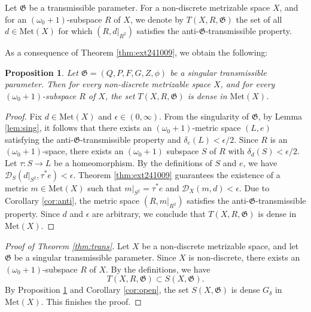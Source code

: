 \documentclass[a4paper, 12pt]{amsart}
\theoremstyle{plain}
\newtheorem{prop}[thm]{Proposition}
\theoremstyle{definition}
\theoremstyle{remark}
\newcommand{\met}[1]{\mathrm{Met}(#1)}
\newcommand{\metdis}{\mathcal{D}}
\begin{document}
Let 
$\mathfrak{G}$
 be a transmissible parameter. 
For a non-discrete metrizable space
 $X$, 
and for an
 $(\omega_0+1)$-subspace 
 $R$ 
 of
  $X$, 
we denote by 
$T(X, R, \mathfrak{G})$ 
the set of all 
$d\in \met{X}$
for which 
$(R, d|_{R^2})$ 
satisfies the 
anti-$\mathfrak{G}$-transmissible 
property.  




As a consequence of 
Theorem \ref{thm:ext241009}, 
we obtain the following:
\begin{prop}\label{prop:dense}
Let 
$\mathfrak{G}=(Q, P, F, G, Z, \phi)$ 
be a singular transmissible parameter. 
Then for every non-discrete metrizable space
 $X$, 
and for every 
$(\omega_0+1)$-subspace 
$R$ 
of 
$X$, 
the set 
$T(X, R, \mathfrak{G})$ 
is dense in 
$\met{X}$.  
\end{prop}
\begin{proof}
Fix 
$d\in \met{X}$ 
and 
$\epsilon\in (0, \infty)$.  
From the singularity of 
$\mathfrak{G}$,  
by Lemma 
\ref{lem:sing}, 
it follows that there exists an 
$(\omega_0+1)$-metric space 
$(L, e)$
satisfying the 
anti-$\mathfrak{G}$-transmissible  property 
and  
$\delta_{e}(L)<\epsilon/2$. 
Since 
$R$ 
is an 
$(\omega_0+1)$-space, 
there exists an 
$(\omega_0+1)$ 
subspace 
$S$ 
of 
$R$ 
with 
$\delta_{d}(S)<\epsilon/2$. 
Let 
$\tau\colon  S\to L$ 
be a homeomorphism. 
By the definitions of 
$S$ 
and 
$e$, 
we have 
$\metdis_{S}(d|_{S^2}, \tau^{*}e)<\epsilon$. 
Theorem 
\ref{thm:ext241009}
guarantees 
the existence of  a metric 
$m\in \met{X}$ 
such that 
$m|_{S^2}=\tau^{*}e$ 
and 
$\metdis_{X}(m, d)<\epsilon$. 
Due to  Corollary 
\ref{cor:anti}, 
the metric space  
$(R, m|_{R^{2}})$ 
satisfies the 
anti-$\mathfrak{G}$-transmissible property. 
Since 
$d$ 
and 
$\epsilon$
 are arbitrary, 
we conclude that  
$T(X, R, \mathfrak{G})$
 is dense in 
$\met{X}$. 
\end{proof}

\begin{proof}[Proof of Theorem \ref{thm:trans}]
Let 
$X$ 
be a non-discrete metrizable space,  
and 
let 
$\mathfrak{G}$ 
be a singular transmissible parameter. 
Since 
$X$ 
is non-discrete, 
there exists an
 $(\omega_0+1)$-subspace 
$R$ 
of 
$X$. 
By the definitions, we have 
	\[
	T(X, R, \mathfrak{G})\subset S(X, \mathfrak{G}). 
	\] 
By Proposition
 \ref{prop:dense} 
 and 
 Corollary \ref{cor:open}, 
 the set 
 $S(X, \mathfrak{G})$ 
 is dense 
 $G_{\delta}$ 
 in 
 $\met{X}$. 
 This finishes the proof. 
\end{proof}
\end{document}
